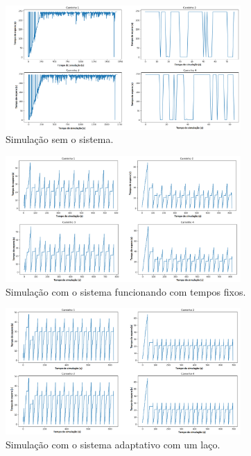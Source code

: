 \begin{figure}[H]
    \begin{center}
    \includegraphics[width=0.8\textwidth]{figuras/Queue_Duration_No_TrafficLight.PNG}
    \end{center}
    \caption[Duração das filas, cenário 1]{Simulação sem o sistema.}
    \label{queueNoTL}
\end{figure}

\begin{figure}[H]
    \begin{center}
    \includegraphics[width=0.8\textwidth]{figuras/Queue_Duration_With_TrafficLight.PNG}
    \end{center}
    \caption[Duração das filas, cenário 2]{Simulação com o sistema funcionando com tempos fixos.}
    \label{queueWithTL}
\end{figure}

\begin{figure}[H]
    \begin{center}
    \includegraphics[width=0.8\textwidth]{figuras/Queue_Duration_With_One_Loop.PNG}
    \end{center}
    \caption[Duração das filas, cenário 3]{Simulação com o sistema adaptativo com um laço.}
    \label{queueOneLoop}
\end{figure}

